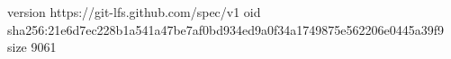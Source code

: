 version https://git-lfs.github.com/spec/v1
oid sha256:21e6d7ec228b1a541a47be7af0bd934ed9a0f34a1749875e562206e0445a39f9
size 9061
